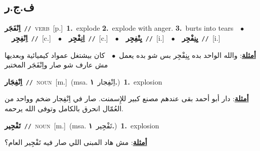 \documentclass[10pt,a4paper,twoside]{article} %
\begin{document}
\begin{multicols}{2}
\vspace{-3mm}
\subsection*{\color{blue}\foreignlanguage{arabic}{ف.ج.ر}\color{blue}{}} 

{\setlength\topsep{0pt}\textbf{\foreignlanguage{arabic}{اِنْفَجَر}}\ {\color{gray}\texttt{//}\color{black}}\ \textsc{verb}\ [p.]\ \textbf{1.}~explode  \textbf{2.}~explode with anger.  \textbf{3.}~burts into tears\ \ $\bullet$\ \ \setlength\topsep{0pt}\textbf{\foreignlanguage{arabic}{اِنْفِجِر}}\ {\color{gray}\texttt{//}\color{black}}\ [c.]\ \ $\bullet$\ \ \setlength\topsep{0pt}\textbf{\foreignlanguage{arabic}{اِنِفْجِر}}\ {\color{gray}\texttt{//}\color{black}}\ [c.]\ \ $\bullet$\ \ \setlength\topsep{0pt}\textbf{\foreignlanguage{arabic}{يِنْفِجِر}}\ {\color{gray}\texttt{//}\color{black}}\ [i.]\ \ $\bullet$\ \ \setlength\topsep{0pt}\textbf{\foreignlanguage{arabic}{يِنِفْجِر}}\ {\color{gray}\texttt{//}\color{black}}\ [i.]\  \begin{flushright}\color{gray}\foreignlanguage{arabic}{\textbf{\underline{\foreignlanguage{arabic}{أمثلة}}}: والله الواحد بده يِنِفْجِر بس شو بده يعمل\ $\bullet$\ \  كان بيشتغل عمواد كيميائية وبعديها مش عارف شو صار واِنْفَجَر المختبر}\end{flushright}\color{black}} \vspace{2mm}

{\setlength\topsep{0pt}\textbf{\foreignlanguage{arabic}{اِنْفِجَار}}\ {\color{gray}\texttt{//}\color{black}}\ \textsc{noun}\ [m.]\ \color{gray}(msa. \foreignlanguage{arabic}{اِنْفِجار}~\foreignlanguage{arabic}{\textbf{١.}})\color{black}\ \textbf{1.}~explosion\  \begin{flushright}\color{gray}\foreignlanguage{arabic}{\textbf{\underline{\foreignlanguage{arabic}{أمثلة}}}: دار أبو أحمد بقى عندهم مصنع كبير للإِسمنت. صار في اِنْفِجار ضخم وواحد من العُمّال انحرق بالكامل وتوفى الله يرحمه.}\end{flushright}\color{black}} \vspace{2mm}

{\setlength\topsep{0pt}\textbf{\foreignlanguage{arabic}{تَفْجِير}}\ {\color{gray}\texttt{//}\color{black}}\ \textsc{noun}\ [m.]\ \color{gray}(msa. \foreignlanguage{arabic}{تَفْجِير}~\foreignlanguage{arabic}{\textbf{١.}})\color{black}\ \textbf{1.}~explosion\  \begin{flushright}\color{gray}\foreignlanguage{arabic}{\textbf{\underline{\foreignlanguage{arabic}{أمثلة}}}: مش هاد المبنى اللي صار فيه تَفْجِير العام؟}\end{flushright}\color{black}} \vspace{2mm}


\end{multicols}
\end{document}
